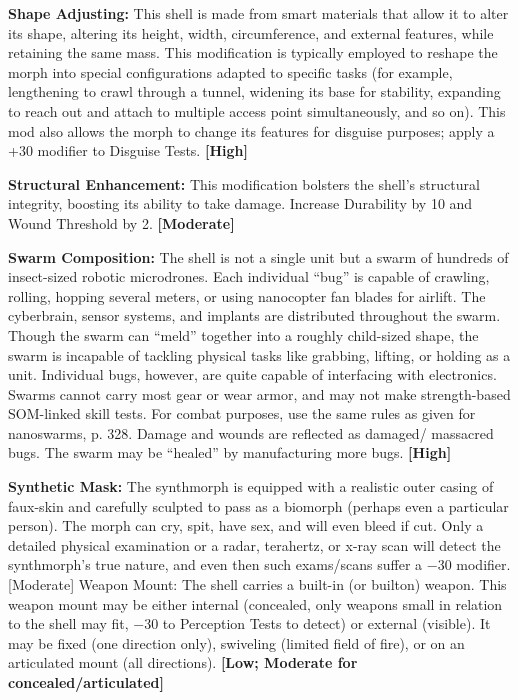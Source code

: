 \textbf{Shape Adjusting:} This shell is made from smart materials that allow it to alter its shape, altering its height, width, circumference, and external features, while retaining the same mass. This modification is typically employed to reshape the morph into special configurations adapted to specific tasks (for example, lengthening to crawl through a tunnel, widening its base for stability, expanding to reach out and attach to multiple access point simultaneously, and so on). This mod also allows the morph to change its features for disguise purposes; apply a +30 modifier to Disguise Tests. \textbf{[High]}

\textbf{Structural Enhancement:} This modification bolsters the shell’s structural integrity, boosting its ability to take damage. Increase Durability by 10 and Wound Threshold by 2. \textbf{[Moderate]}

\textbf{Swarm Composition:} The shell is not a single unit but a swarm of hundreds of insect-sized robotic microdrones. Each individual ``bug'' is capable of crawling, rolling, hopping several meters, or using nanocopter fan blades for airlift. The cyberbrain, sensor systems, and implants are distributed throughout the swarm. Though the swarm can ``meld'' together into a roughly child-sized shape, the swarm is incapable of tackling physical tasks like grabbing, lifting, or holding as a unit. Individual bugs, however, are quite capable of interfacing with electronics. Swarms cannot carry most gear or wear armor, and may not make strength-based SOM-linked skill tests. For combat purposes, use the same rules as given for nanoswarms, p. 328. Damage and wounds are reflected as damaged/ massacred bugs. The swarm may be ``healed'' by manufacturing more bugs. \textbf{[High]}

\textbf{Synthetic Mask:} The synthmorph is equipped with a realistic outer casing of faux-skin and carefully sculpted to pass as a biomorph (perhaps even a particular person). The morph can cry, spit, have sex, and will even bleed if cut. Only a detailed physical examination or a radar, terahertz, or x-ray scan will detect the synthmorph’s true nature, and even then such exams/scans suffer a $-$30 modifier. [Moderate] Weapon Mount: The shell carries a built-in (or builton) weapon. This weapon mount may be either internal (concealed, only weapons small in relation to the shell may fit, $-$30 to Perception Tests to detect) or external (visible). It may be fixed (one direction only), swiveling (limited field of fire), or on an articulated mount (all directions). \textbf{[Low; Moderate for concealed/articulated]}

